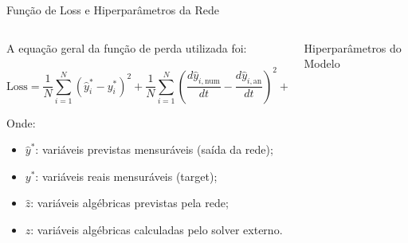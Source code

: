 \begin{frame}{Função de Loss e Hiperparâmetros da Rede}
    \begin{columns}[T]
        \begin{column}{0.55\textwidth}
            \footnotesize
            A equação geral da função de perda utilizada foi:

            \[
            \text{Loss} = \frac{1}{N} \sum_{i=1}^{N} (\hat{y}_i^* - y_i^*)^2
            + \frac{1}{N} \sum_{i=1}^{N} \left( \frac{d\hat{y}_{i,\text{num}}}{dt} - \frac{d\hat{y}_{i,\text{an}}}{dt} \right)^2
            + \frac{1}{N} \sum_{i=1}^{N} (\hat{z}_i - z_i)^2
            \]

            \vspace{0.2cm}
            Onde:
            \begin{itemize}
                \item \( \hat{y}^* \): variáveis previstas mensuráveis (saída da rede);
                \item \( y^* \): variáveis reais mensuráveis (target);
                \item \( \hat{z} \): variáveis algébricas previstas pela rede;
                \item \( z \): variáveis algébricas calculadas pelo solver externo.
            \end{itemize}
        \end{column}

        \begin{column}{0.45\textwidth}
            \vspace{2cm}
            \begin{block}{\centering Hiperparâmetros do Modelo}
                \footnotesize
                \centering
            \end{block}
        \end{column}
    \end{columns}
\end{frame}

